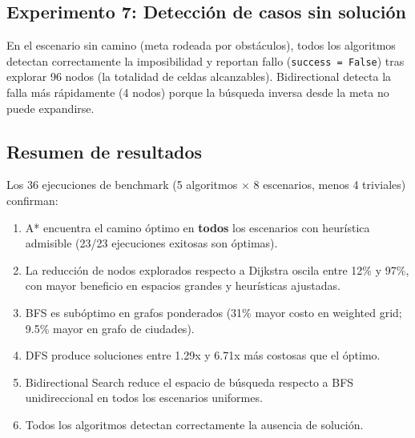 \subsection{Experimento 7: Detección de casos sin solución}

En el escenario sin camino (meta rodeada por obstáculos), todos los algoritmos detectan correctamente la imposibilidad y reportan fallo (\texttt{success = False}) tras explorar 96 nodos (la totalidad de celdas alcanzables). Bidirectional detecta la falla más rápidamente (4 nodos) porque la búsqueda inversa desde la meta no puede expandirse.

\subsection{Resumen de resultados}

Los 36 ejecuciones de benchmark (5 algoritmos $\times$ 8 escenarios, menos 4 triviales) confirman:

\begin{enumerate}
    \item A* encuentra el camino óptimo en \textbf{todos} los escenarios con heurística admisible (23/23 ejecuciones exitosas son óptimas).
    \item La reducción de nodos explorados respecto a Dijkstra oscila entre 12\% y 97\%, con mayor beneficio en espacios grandes y heurísticas ajustadas.
    \item BFS es subóptimo en grafos ponderados (31\% mayor costo en weighted grid; 9.5\% mayor en grafo de ciudades).
    \item DFS produce soluciones entre 1.29x y 6.71x más costosas que el óptimo.
    \item Bidirectional Search reduce el espacio de búsqueda respecto a BFS unidireccional en todos los escenarios uniformes.
    \item Todos los algoritmos detectan correctamente la ausencia de solución.
\end{enumerate}
